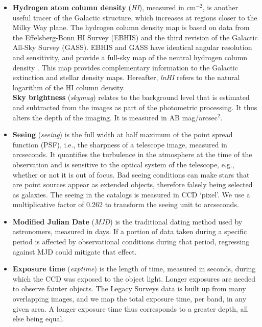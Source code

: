 \begin{itemize}
    \item \textbf{Hydrogen atom column density} (\textit{HI}), measured in cm$^{-2}$, is another useful tracer of the Galactic structure, which increases at regions closer to the Milky Way plane. The hydrogen column density map is based on data from the Effelsberg-Bonn HI Survey (EBHIS) and the third revision of the Galactic All-Sky Survey (GASS). EBHIS and GASS have identical angular resolution and sensitivity, and provide a full-sky map of the neutral hydrogen column density \citep{bekhti2016hi4pi}. This map provides complementary information to the Galactic extinction and stellar density maps. Hereafter, \textit{lnHI} refers to the natural logarithm of the HI column density.\\

  {\bf Sky brightness} (\textit{skymag}) relates to the background level that is estimated and subtracted from the images as part of the photometric processing. It thus alters the depth of the imaging. It is measured in AB mag/arcsec$^{2}$. \\


    \item {\bf Seeing} (\textit{seeing}) is the full width at half maximum of the point spread function (PSF), i.e., the sharpness of a telescope image, measured in arcseconds. It quantifies the turbulence in the atmosphere at the time of the observation and is sensitive to the optical system of the telescope, e.g., whether or not it is out of focus. Bad seeing conditions can make stars that are point sources appear as extended objects, therefore falsely being selected as galaxies. The seeing in the catalogs is measured in CCD `pixel'. We use a multiplicative factor of 0.262 to transform the seeing unit to arcseconds.\\

    \item {\bf Modified Julian Date} (\textit{MJD}) is the traditional dating method used by astronomers, measured in days. If a portion of data taken during a specific period is affected by observational conditions during that period, regressing against MJD could mitigate that effect.\\

    \item {\bf Exposure time} (\textit{exptime}) is the length of time, measured in seconds, during which the CCD was exposed to the object light. Longer exposures are needed to observe fainter objects. The Legacy Surveys data is built up from many overlapping images, and we map the total exposure time, per band, in any given area. A longer exposure time thus corresponds to a greater depth, all else being equal.
\end{itemize}

